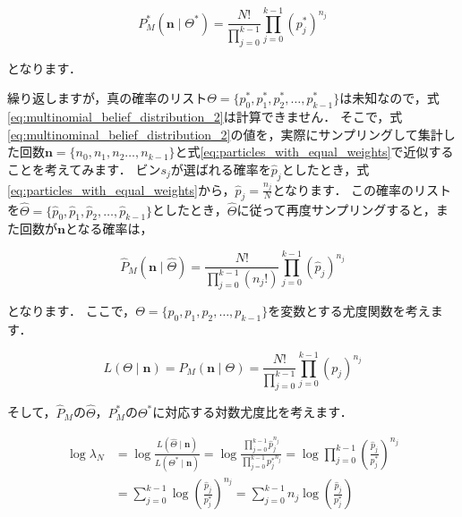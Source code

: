 \documentclass[{../../master}]{subfiles}
\begin{document}
\begin{equation}
  P^{*}_{M}(\bm{n} \mid \Theta^{*}) = \frac{N!}{\prod^{k-1}_{j=0}}\prod^{k-1}_{j=0}(p^{*}_{j})^{n_{j}}
  \label{eq:multinominal_belief_distribution_2}
\end{equation}

\noindent
となります．

繰り返しますが，真の確率のリスト$\Theta = \{p^{*}_{0}, p^{*}_{1}, p^{*}_{2}, \ldots , p^{*}_{k-1}\}$は未知なので，式\ref{eq:multinomial_belief_distribution_2}は計算できません．
そこで，式\ref{eq:multinominal_belief_distribution_2}の値を，実際にサンプリングして集計した回数$\bm{n} = \{n_{0}, n_{1}, n_{2} \ldots , n_{k-1}\}$と式\ref{eq:particles_with_equal_weights}で近似することを考えてみます．
ビン$s_{j}$が選ばれる確率を$\hat{p}_{j}$としたとき，式\ref{eq:particles_with_equal_weights}から，$\hat{p}_{j}=\frac{n_{j}}{N}$となります．
この確率のリストを$\hat{\Theta} = \{\hat{p}_{0}, \hat{p}_{1}, \hat{p}_{2}, \ldots , \hat{p}_{k-1}\}$としたとき，$\hat{\Theta}$に従って再度サンプリングすると，また回数が$\bm{n}$となる確率は，

\begin{equation}
  \hat{P}_{M}(\bm{n} \mid \hat{\Theta}) = \frac{N!}{\prod^{k-1}_{j=0}(n_{j}!)}\prod^{k-1}_{j=0}(\hat{p}_{j})^{n_{j}}
\end{equation}

\noindent
となります．
ここで，$\Theta = \{p_{0}, p_{1}, p_{2}, \ldots , p_{k-1}\}$を変数とする尤度関数を考えます．

\begin{equation}
  L(\Theta \mid \bm{n}) = P_{M}(\bm{n} \mid \Theta) = \frac{N!}{\prod^{k-1}_{j=0}}\prod^{k-1}_{j=0}(p_{j})^{n_{j}}
\end{equation}

そして，$\hat{P}_{M}$の$\hat{\Theta}$，$P^{*}_{M}$の$\Theta^{*}$に対応する対数尤度比を考えます．

\begin{equation}
  \begin{split}
    \log{\lambda_{N}} &= \log{\frac{L(\hat{\Theta} \mid \bm{n})}{L(\Theta^{*} \mid \bm{n})}} = \log{\frac{\prod^{k-1}_{j=0}\hat{p}_{j}^{n_{j}}}{\prod^{k-1}_{j=0}{p^{*}_{j}}^{n_{j}}}} = \log{\prod^{k-1}_{j=0}\left(\frac{\hat{p}_{j}}{p^{*}_{j}}\right)^{n_{j}}}\\
    &= \sum^{k-1}_{j=0} \log{\left(\frac{\hat{p}_{j}}{p^{*}_{j}}\right)^{n_{j}}} = \sum^{k-1}_{j=0} n_{j}\log{\left(\frac{\hat{p}_{j}}{p^{*}_{j}}\right)}
  \end{split}
\end{equation}
\end{document}
